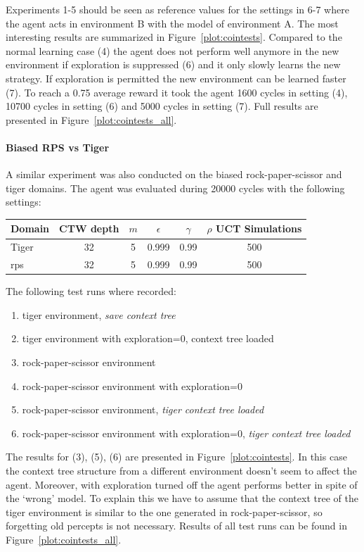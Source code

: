 \documentclass[paper=a4, fontsize=11pt]{scrartcl} %
\numberwithin{equation}{section} %
\numberwithin{figure}{section} %
\numberwithin{table}{section} %
\begin{document}
Experiments 1-5 should be seen as reference values for the settings in 6-7 where the agent acts in environment B with the model of environment A. The most interesting results are summarized in Figure~\ref{plot:cointests}.  Compared to the normal learning case (4) the agent does not perform well anymore in the new environment if exploration is suppressed (6) and it only slowly learns the new strategy. If exploration is permitted the new environment can be learned faster (7). To reach a 0.75 average reward it took the agent 1600 cycles in setting (4), 10700 cycles in setting (6) and 5000 cycles in setting (7). Full results are presented in Figure~\ref{plot:cointests_all}.

\paragraph{Biased RPS vs Tiger}
A similar experiment was also conducted on the biased rock-paper-scissor and tiger domains. The agent was evaluated during 20000 cycles with the following settings:

\bigskip

\begin{tabular}{|l|c|c|c|c|c|}
\hline
Domain & CTW depth & $m$ & $\epsilon$ &$\gamma $ & $\rho$ UCT Simulations\\\hline
Tiger & 32 & 5 & 0.999 & 0.99 & 500\\
rps & 32 & 5 & 0.999 & 0.99 & 500\\\hline
\end{tabular}

\bigskip

The following test runs where recorded:
\begin{enumerate}
 \setlength{\itemsep}{0cm}%
  \setlength{\parskip}{0cm}%
\item tiger environment,\emph{ save context tree}
\item tiger environment with exploration=0, context tree loaded
\item rock-paper-scissor environment
\item rock-paper-scissor environment with exploration=0
\item rock-paper-scissor environment, \emph{tiger context tree loaded} 
\item rock-paper-scissor environment with exploration=0, \emph{tiger context tree loaded} 
\end{enumerate}

The results for (3), (5), (6) are presented in Figure~\ref{plot:cointests}. In this case the context tree structure from a different environment doesn't seem to affect the agent. Moreover, with exploration turned off the agent performs better in spite of the `wrong' model. To explain this we have to assume that the context tree of the tiger environment is similar to the one generated in rock-paper-scissor, so forgetting old percepts is not necessary. Results of all test runs can be found in Figure~\ref{plot:cointests_all}.
\end{document}
